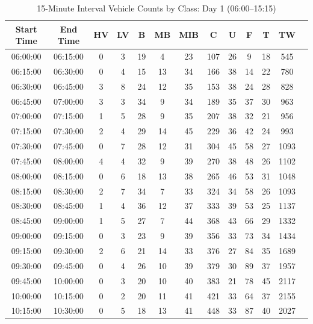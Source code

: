 \begin{table}[h!]
    \centering
    \small
    \caption{15-Minute Interval Vehicle Counts by Class: Day 1 (06:00--15:15)}
    \label{tab:time_data_part1}
    \begin{tabular}{ccccccccccccc}
        \toprule
        \textbf{Start Time} & \textbf{End Time} & \textbf{HV} & \textbf{LV} & \textbf{B} & \textbf{MB} & \textbf{MIB} & \textbf{C} & \textbf{U} & \textbf{F} & \textbf{T} & \textbf{TW} \\
        \midrule
        06:00:00 & 06:15:00 & 0 & 3 & 19 & 4 & 23 & 107 & 26 & 9 & 18 & 545 \\
        06:15:00 & 06:30:00 & 0 & 4 & 15 & 13 & 34 & 166 & 38 & 14 & 22 & 780 \\
        06:30:00 & 06:45:00 & 3 & 8 & 24 & 12 & 35 & 153 & 38 & 24 & 28 & 828 \\
        06:45:00 & 07:00:00 & 3 & 3 & 34 & 9 & 34 & 189 & 35 & 37 & 30 & 963 \\
        07:00:00 & 07:15:00 & 1 & 5 & 28 & 9 & 35 & 207 & 38 & 32 & 21 & 956 \\
        07:15:00 & 07:30:00 & 2 & 4 & 29 & 14 & 45 & 229 & 36 & 42 & 24 & 993 \\
        07:30:00 & 07:45:00 & 0 & 7 & 28 & 12 & 31 & 304 & 45 & 58 & 27 & 1093 \\
        07:45:00 & 08:00:00 & 4 & 4 & 32 & 9 & 39 & 270 & 38 & 48 & 26 & 1102 \\
        08:00:00 & 08:15:00 & 0 & 6 & 18 & 13 & 38 & 265 & 46 & 53 & 31 & 1048 \\
        08:15:00 & 08:30:00 & 2 & 7 & 34 & 7 & 33 & 324 & 34 & 58 & 26 & 1093 \\
        08:30:00 & 08:45:00 & 1 & 4 & 36 & 12 & 37 & 333 & 39 & 53 & 25 & 1137 \\
        08:45:00 & 09:00:00 & 1 & 5 & 27 & 7 & 44 & 368 & 43 & 66 & 29 & 1332 \\
        09:00:00 & 09:15:00 & 0 & 3 & 23 & 9 & 39 & 356 & 33 & 73 & 34 & 1434 \\
        09:15:00 & 09:30:00 & 2 & 6 & 21 & 14 & 33 & 376 & 27 & 84 & 35 & 1689 \\
        09:30:00 & 09:45:00 & 0 & 4 & 26 & 10 & 39 & 379 & 30 & 89 & 37 & 1957 \\
        09:45:00 & 10:00:00 & 0 & 3 & 20 & 10 & 40 & 383 & 21 & 78 & 45 & 2117 \\
        10:00:00 & 10:15:00 & 0 & 2 & 20 & 11 & 41 & 421 & 33 & 64 & 37 & 2155 \\
        10:15:00 & 10:30:00 & 0 & 5 & 18 & 13 & 41 & 448 & 33 & 87 & 40 & 2027 \\

\end{tabular}
\end{table}
